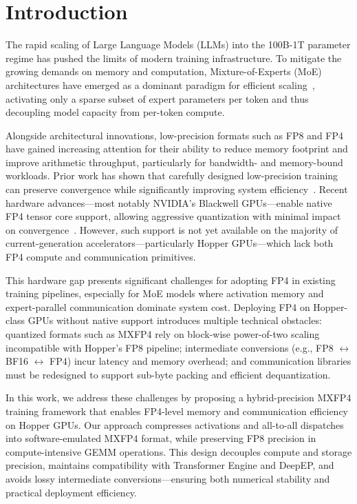 \section{Introduction}
\label{sec:intro}

The rapid scaling of Large Language Models (LLMs) into the 100B-1T parameter regime has pushed the limits of modern training infrastructure. To mitigate the growing demands on memory and computation, Mixture-of-Experts (MoE) architectures have emerged as a dominant paradigm for efficient scaling~\cite{gshard2021, mixtral2024, deepseekv3, kimik22025, gptoss2025}, activating only a sparse subset of expert parameters per token and thus decoupling model capacity from per-token compute.

Alongside architectural innovations, low-precision formats such as FP8 and FP4 have gained increasing attention for their ability to reduce memory footprint and improve arithmetic throughput, particularly for bandwidth- and memory-bound workloads. Prior work has shown that carefully designed low-precision training can preserve convergence while significantly improving system efficiency~\cite{deepseekv3, mxfp8recipe}. Recent hardware advances—most notably NVIDIA's Blackwell GPUs—enable native FP4 tensor core support, allowing aggressive quantization with minimal impact on convergence~\cite{mxfp4training2025, nvfp4training2025}. However, such support is not yet available on the majority of current-generation accelerators—particularly Hopper GPUs—which lack both FP4 compute and communication primitives.

This hardware gap presents significant challenges for adopting FP4 in existing training pipelines, especially for MoE models where activation memory and expert-parallel communication dominate system cost. Deploying FP4 on Hopper-class GPUs without native support introduces multiple technical obstacles: quantized formats such as MXFP4 rely on block-wise power-of-two scaling incompatible with Hopper's FP8 pipeline; intermediate conversions (e.g., FP8 $\leftrightarrow$ BF16 $\leftrightarrow$ FP4) incur latency and memory overhead; and communication libraries must be redesigned to support sub-byte packing and efficient dequantization.

In this work, we address these challenges by proposing a hybrid-precision MXFP4 training framework that enables FP4-level memory and communication efficiency on Hopper GPUs. Our approach compresses activations and all-to-all dispatches into software-emulated MXFP4 format, while preserving FP8 precision in compute-intensive GEMM operations. This design decouples compute and storage precision, maintains compatibility with Transformer Engine and DeepEP, and avoids lossy intermediate conversions—ensuring both numerical stability and practical deployment efficiency.

